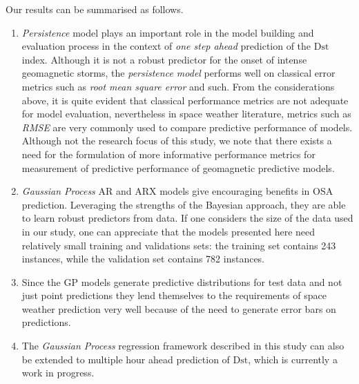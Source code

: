 Our results can be summarised as follows.
\begin{enumerate}
      \item \emph{Persistence} model plays an important role in the model building and evaluation process in the context of \emph{one step ahead} prediction of the $ \mathrm{Dst}$ index. Although it is not a robust predictor for the onset of intense geomagnetic storms, the \emph{persistence model} performs well on classical error metrics such as \emph{root mean square error} and such. From the considerations above, it is quite evident that classical performance metrics are not adequate for model evaluation, nevertheless in space weather literature, metrics such as \emph{RMSE} are very commonly used to compare predictive performance of models. Although not the research focus of this study, we note that there exists a need for the formulation of more informative performance metrics for measurement of predictive performance of geomagnetic predictive models.
      
      \item \emph{Gaussian Process} AR and ARX models give encouraging benefits in OSA prediction. Leveraging the strengths of the Bayesian approach, they are able to learn robust predictors from data. If one considers the size of the data used in our study, one can appreciate that the models presented here need relatively small training and validations sets: the training set contains 243 instances, while the validation set contains 782 instances.
      
      \item Since the GP models generate predictive distributions for test data and not just point predictions they lend themselves to the requirements of space weather prediction very well because of the need to generate error bars on predictions.
      
      \item The \emph{Gaussian Process} regression framework described in this study can also be extended to multiple hour ahead prediction of $ \mathrm{Dst}$, which is currently a work in progress.
\end{enumerate}





%
%
%
%
%


